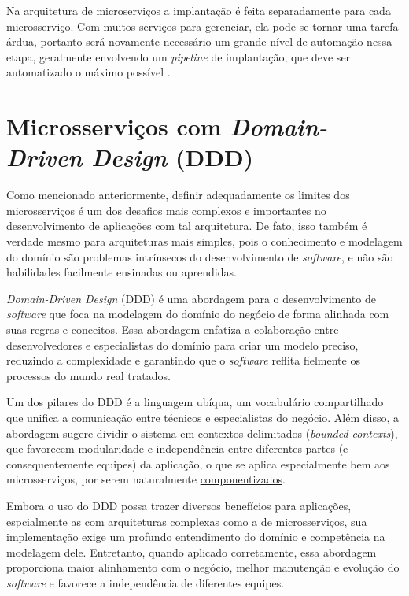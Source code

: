 Na arquitetura de microserviços a implantação é feita separadamente para cada microsserviço. Com muitos serviços para gerenciar, ela pode se tornar uma tarefa árdua, portanto será novamente necessário um grande nível de automação nessa etapa, geralmente envolvendo um \emph{pipeline} de implantação, que deve ser automatizado o máximo possível \cite{martin-fowler-microservice-prereq}.

\section{Microsserviços com \emph{Domain-Driven Design} (DDD)}\label{section-ddd}

Como mencionado anteriormente, definir adequadamente os limites dos microsserviços é um dos desafios mais complexos e importantes no desenvolvimento de aplicações com tal arquitetura. De fato, isso também é verdade mesmo para arquiteturas mais simples, pois o conhecimento e modelagem do domínio são problemas intrínsecos do desenvolvimento de \emph{software}, e não são habilidades facilmente ensinadas ou aprendidas. 
\cite{livro-ddd}

\emph{Domain-Driven Design} (DDD) é uma abordagem para o desenvolvimento de \emph{software} que foca na modelagem do domínio do negócio de forma alinhada com suas regras e conceitos. Essa abordagem enfatiza a colaboração entre desenvolvedores e especialistas do domínio para criar um modelo preciso, reduzindo a complexidade e garantindo que o \emph{software} reflita fielmente os processos do mundo real tratados.
\cite{livro-ddd}

Um dos pilares do DDD é a linguagem ubíqua, um vocabulário compartilhado que unifica a comunicação entre técnicos e especialistas do negócio. Além disso, a abordagem sugere dividir o sistema em contextos delimitados (\emph{bounded contexts}), que favorecem modularidade e independência entre diferentes partes (e consequentemente equipes) da aplicação, o que se aplica especialmente bem aos microsserviços, por serem naturalmente \hyperref[secao-componentizacao]{componentizados}. 
\cite{livro-ddd}

Embora o uso do DDD possa trazer diversos benefícios para aplicações, espcialmente as com arquiteturas complexas como a de microsserviços, sua implementação exige um profundo entendimento do domínio e competência na modelagem dele. Entretanto, quando aplicado corretamente, essa abordagem proporciona maior alinhamento com o negócio, melhor manutenção e evolução do \emph{software} e favorece a independência de diferentes equipes.
\cite{livro-ddd}


